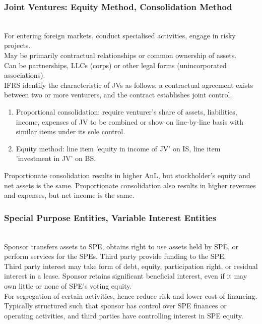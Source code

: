 \subsubsection{Joint Ventures: Equity Method, Consolidation Method}

\begin{remark} \\
For entering foreign markets, conduct specialised activities, engage in risky projects.\\
May be primarily contractual relationships or common ownership of assets.\\
Can be partnerships, LLCs (corps) or other legal forms (unincorporated associations).\\
IFRS identify the characteristic of JVs as follows: a contractual agreement exists between two or more venturers, and the contract establishes joint control.
\end{remark}

\begin{method} 
\begin{enumerate}[label=\roman*.]
\setlength{\itemsep}{0pt}
\item Proportional consolidation: require venturer’s share of assets, liabilities, income, expenses of JV to be combined or show on line-by-line basis with similar items under its sole control.
\item Equity method: line item 'equity in income of JV' on IS, line item 'investment in JV' on BS.
\end{enumerate}
Proportionate consolidation results in higher AnL, but stockholder's equity and net assets is the same. Proportionate consolidation also results in higher revenues and expenses, but net income is the same.
\end{method}

\subsubsection{Special Purpose Entities, Variable Interest Entities}

\begin{remark} \\
Sponsor transfers assets to SPE, obtains right to use assets held by SPE, or perform services for the SPEs. Third party provide funding to the SPE.\\
Third party interest may take form of debt, equity, participation right, or residual interest in a lease. Sponsor retains significant beneficial interest, even if it may own little or none of SPE’s voting equity.\\
For segregation of certain activities, hence reduce risk and lower cost of financing.\\
Typically structured such that sponsor has control over SPE finances or operating activities, and third parties have controlling interest in SPE equity.
\end{remark}

